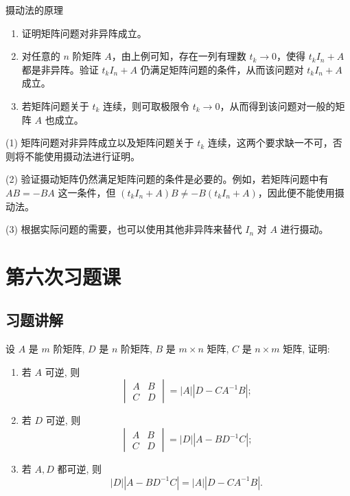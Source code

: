 \documentclass[lang=cn,12pt]{elegantbook}
\begin{document}
\begin{note}摄动法的原理
    \begin{enumerate}[label=(\arabic*)]
        \item 证明矩阵问题对非异阵成立。
        \item 对任意的 \( n \) 阶矩阵 \( A \)，由上例可知，存在一列有理数 \( t_k \to 0 \)，使得 \( t_k I_n + A \) 都是非异阵。验证 \( t_k I_n + A \) 仍满足矩阵问题的条件，从而该问题对 \( t_k I_n + A \) 成立。
        \item 若矩阵问题关于 \( t_k \) 连续，则可取极限令 \( t_k \to 0 \)，从而得到该问题对一般的矩阵 \( A \) 也成立。
    \end{enumerate}
    
    \begin{remark}(1) 矩阵问题对非异阵成立以及矩阵问题关于 \( t_k \) 连续，这两个要求缺一不可，否则将不能使用摄动法进行证明。
    
    (2) 验证摄动矩阵仍然满足矩阵问题的条件是必要的。例如，若矩阵问题中有 \( AB = -BA \) 这一条件，但 \( (t_k I_n + A)B \neq -B(t_k I_n + A) \)，因此便不能使用摄动法。
    
    (3) 根据实际问题的需要，也可以使用其他非异阵来替代 \( I_n \) 对 \( A \) 进行摄动。
    \end{remark}   
\end{note}

\chapter{第六次习题课}
\section{习题讲解}

\begin{example}[行列式的降阶公式]
    设 \( A \) 是 \( m \) 阶矩阵, \( D \) 是 \( n \) 阶矩阵, \( B \) 是 \( m \times n \) 矩阵, \( C \) 是 \( n \times m \) 矩阵, 证明:  
    \begin{enumerate}
        \item 若 \( A \) 可逆, 则  
        \[
        \begin{vmatrix}
        A & B \\
        C & D
        \end{vmatrix} = |A||D - CA^{-1}B|;
        \]
        \item 若 \( D \) 可逆, 则  
        \[
        \begin{vmatrix}
        A & B \\
        C & D
        \end{vmatrix} = |D||A - BD^{-1}C|;
        \]
        \item 若 \( A, D \) 都可逆, 则  
        \[
        |D||A - BD^{-1}C| = |A||D - CA^{-1}B|.
        \]
    \end{enumerate}
    \end{example}
    
\end{document}
